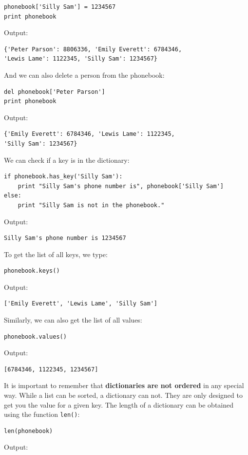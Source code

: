 \begin{verbatim}
phonebook['Silly Sam'] = 1234567
print phonebook
\end{verbatim}
Output:

\begin{verbatim}
{'Peter Parson': 8806336, 'Emily Everett': 6784346,
'Lewis Lame': 1122345, 'Silly Sam': 1234567}
\end{verbatim}
And we can also delete a person from the phonebook:

\begin{verbatim}
del phonebook['Peter Parson']
print phonebook
\end{verbatim}
Output:

\begin{verbatim}
{'Emily Everett': 6784346, 'Lewis Lame': 1122345, 
'Silly Sam': 1234567}
\end{verbatim}
We can check if a key is in the dictionary:

\begin{verbatim}
if phonebook.has_key('Silly Sam'):
    print "Silly Sam's phone number is", phonebook['Silly Sam']
else:
    print "Silly Sam is not in the phonebook."
\end{verbatim}
Output:

\begin{verbatim}
Silly Sam's phone number is 1234567
\end{verbatim}
To get the list of all keys, we type:

\begin{verbatim}
phonebook.keys()
\end{verbatim}
Output:

\begin{verbatim}
['Emily Everett', 'Lewis Lame', 'Silly Sam']
\end{verbatim}
Similarly, we can also get the list of all values:

\begin{verbatim}
phonebook.values()
\end{verbatim}
Output:

\begin{verbatim}
[6784346, 1122345, 1234567]
\end{verbatim}
It is important to remember that {\bf dictionaries are not ordered} in any 
special way. While a list can be sorted, a dictionary can not. They are only 
designed to get you the value for a given key. 
The length of a dictionary can be obtained using the function {\tt len()}:

\begin{verbatim}
len(phonebook)
\end{verbatim}
Output:

